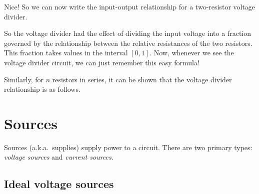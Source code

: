 \documentclass[electronics.tex]{subfiles}
\begin{document}

Nice! So we can now write the input-output relationship for a two-resistor voltage divider.

So the voltage divider had the effect of dividing the input voltage into a fraction governed by the relationship between the relative resistances of the two resistors.
This fraction takes values in the interval $[0,1]$.
Now, whenever we see the voltage divider circuit, we can just remember this easy formula!

Similarly, for $n$ resistors in series, it can be shown that the voltage divider relationship is as follows.

\section{Sources}
\tags{}

Sources (a.k.a.\ supplies) supply power to a circuit. There are two primary types: \emph{voltage sources} and \emph{current sources}.

\subsection{Ideal voltage sources}
\end{document}
